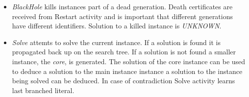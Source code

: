 \begin{itemize}
  \item \emph{BlackHole} kills instances part of a dead generation.
  Death certificates are received from Restart activity and is important
  that different generations have different identifiers. Solution to
  a killed instance is \emph{UNKNOWN}.

  \item \emph{Solve} attemts to solve the current instance. If a solution
  is found it is propagated back up on the search tree. If a solution
  is not found a smaller instance, the \emph{core}, is generated. The solution
  of the core instance can be used to deduce a solution to the main instance
  instance a solution to the instance being solved can be deduced. In case
  of contradiction Solve activity learns last branched literal.

\end{itemize}


